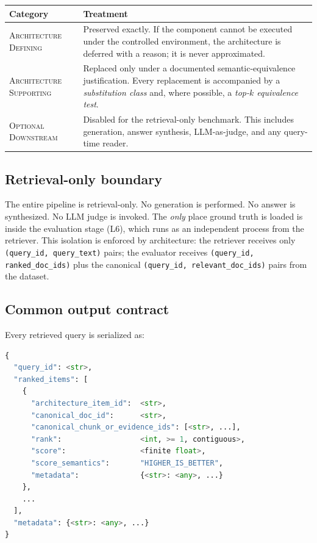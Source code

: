 \documentclass[11pt,a4paper]{article}
\begin{document}
\begin{center}
\begin{tabular}{p{4.1cm} p{10.5cm}}
\toprule
\textbf{Category} & \textbf{Treatment} \\
\midrule
\textsc{Architecture Defining} &
  Preserved exactly. If the component cannot be executed under
  the controlled environment, the architecture is deferred with a
  reason; it is never approximated. \\
\textsc{Architecture Supporting} &
  Replaced only under a documented semantic-equivalence
  justification. Every replacement is accompanied by a
  \emph{substitution class} and, where possible, a
  \emph{top-$k$ equivalence test}. \\
\textsc{Optional Downstream} &
  Disabled for the retrieval-only benchmark. This includes
  generation, answer synthesis, LLM-as-judge, and any
  query-time reader. \\
\bottomrule
\end{tabular}
\end{center}

\subsection{Retrieval-only boundary}
The entire pipeline is retrieval-only. No generation is performed.
No answer is synthesized. No LLM judge is invoked. The
\emph{only} place ground truth is loaded is inside the evaluation
stage (L6), which runs as an independent process from the
retriever. This isolation is enforced by architecture: the retriever
receives only \texttt{(query\_id, query\_text)} pairs; the
evaluator receives \texttt{(query\_id, ranked\_doc\_ids)} plus the
canonical \texttt{(query\_id, relevant\_doc\_ids)} pairs from the
dataset.

\subsection{Common output contract}
Every retrieved query is serialized as:
\begin{lstlisting}[language=Python]
{
  "query_id": <str>,
  "ranked_items": [
    {
      "architecture_item_id":  <str>,
      "canonical_doc_id":      <str>,
      "canonical_chunk_or_evidence_ids": [<str>, ...],
      "rank":                  <int, >= 1, contiguous>,
      "score":                 <finite float>,
      "score_semantics":       "HIGHER_IS_BETTER",
      "metadata":              {<str>: <any>, ...}
    },
    ...
  ],
  "metadata": {<str>: <any>, ...}
}
\end{lstlisting}
\end{document}
